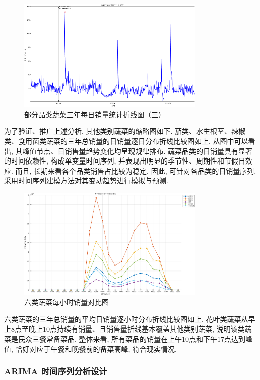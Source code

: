 \documentclass{cumcmthesis}
\begin{document}
\begin{figure}[H]
    \centering
    \includegraphics[width=0.8\textwidth]{其他品类日销量折线图3.png} 
    \caption{部分品类蔬菜三年每日销量统计折线图（三）}
\end{figure}

为了验证、推广上述分析, 其他类别蔬菜的缩略图如下. 茄类、水生根茎、辣椒类、食用菌类蔬菜的三年总销量的日销量逐日分布折线比较图如上. 从图中可以看出, 其峰值节点、日销售量趋势变化均呈现规律排布. 蔬菜品类的日销量具有显著的时间依赖性, 构成单变量时间序列, 并表现出明显的季节性、周期性和节假日效应. 而且, 长期来看各个品类销售占比较为稳定, 因此, 可针对各品类的日销量序列, 采用时间序列建模方法对其变动趋势进行模拟与预测.

\begin{figure}[H]
    \centering
    \includegraphics[width=0.8\textwidth]{6个数据集每小时销量对比.png} 
    \caption{六类蔬菜每小时销量对比图}
\end{figure}

六类蔬菜的三年总销量的平均日销量逐小时分布折线比较图如上. 花叶类蔬菜从早上8点至晚上10点持续有销量、且销售量折线基本覆盖其他类别蔬菜, 说明该类蔬菜是民众三餐常备菜品. 整体来看, 所有菜品的销量在上午10点和下午17点达到峰值, 恰好对应于午餐和晚餐前的备菜高峰, 符合现实情况.

\subsubsection{ARIMA 时间序列分析设计}
\end{document}

